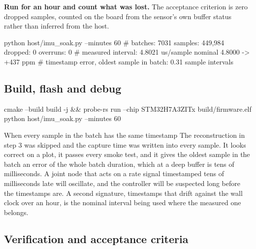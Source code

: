 \begin{steps}
\item \textbf{Run for an hour and count what was lost.} The acceptance criterion
is zero dropped samples, counted on the board from the sensor's own buffer
status rather than inferred from the host.
\begin{shellcode}
python host/imu_soak.py --minutes 60
# batches: 7031   samples: 449,984   dropped: 0   overruns: 0
# measured interval: 4.8021 us/sample nominal 4.8000 -> +437 ppm
# timestamp error, oldest sample in batch: 0.31 sample intervals
\end{shellcode}
\end{steps}

\subsection*{Build, flash and debug}


\begin{shellcode}
cmake --build build -j && probe-rs run --chip STM32H7A3ZITx build/firmware.elf
python host/imu_soak.py --minutes 60
\end{shellcode}

\begin{note}{When every sample in the batch has the same timestamp}
The reconstruction in step 3 was skipped and the capture time was written into
every sample. It looks correct on a plot, it passes every smoke test, and it
gives the oldest sample in the batch an error of the whole batch duration, which
at a deep buffer is tens of milliseconds. A joint node that acts on a rate
signal timestamped tens of milliseconds late will oscillate, and the controller
will be suspected long before the timestamps are. A second signature, timestamps that drift
against the wall clock over an hour, is the nominal interval being used where
the measured one belongs.
\end{note}

\subsection*{Verification and acceptance criteria}

